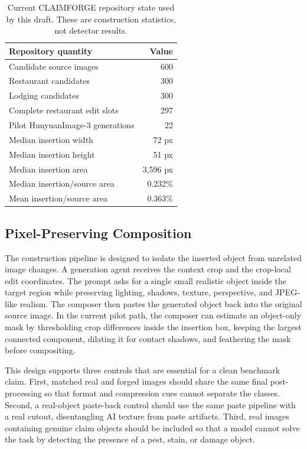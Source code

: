 \begin{table}[t]
\centering
\small
\begin{tabular}{lr}
\toprule
Repository quantity & Value \\
\midrule
Candidate source images & 600 \\
Restaurant candidates & 300 \\
Lodging candidates & 300 \\
Complete restaurant edit slots & 297 \\
Pilot HunyuanImage-3 generations & 22 \\
Median insertion width & 72 px \\
Median insertion height & 51 px \\
Median insertion area & 3,596 px \\
Median insertion/source area & 0.232\% \\
Mean insertion/source area & 0.363\% \\
\bottomrule
\end{tabular}
\caption{Current CLAIMFORGE repository state used by this draft. These are construction statistics, not detector results.}
\label{tab:repo-state}
\end{table}

\subsection{Pixel-Preserving Composition}

The construction pipeline is designed to isolate the inserted object from unrelated image changes. A generation agent receives the context crop and the crop-local edit coordinates. The prompt asks for a single small realistic object inside the target region while preserving lighting, shadows, texture, perspective, and JPEG-like realism. The composer then pastes the generated object back into the original source image. In the current pilot path, the composer can estimate an object-only mask by thresholding crop differences inside the insertion box, keeping the largest connected component, dilating it for contact shadows, and feathering the mask before compositing.

This design supports three controls that are essential for a clean benchmark claim. First, matched real and forged images should share the same final post-processing so that format and compression cues cannot separate the classes. Second, a real-object paste-back control should use the same paste pipeline with a real cutout, disentangling AI texture from paste artifacts. Third, real images containing genuine claim objects should be included so that a model cannot solve the task by detecting the presence of a pest, stain, or damage object.


